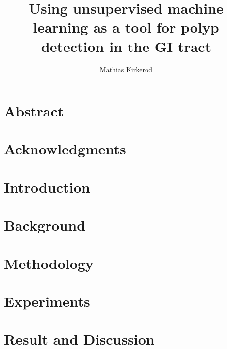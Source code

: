 \documentclass[a4paper,english,twoside,11pt]{ifimaster}
\title{Using unsupervised machine learning as a tool for polyp detection in the GI tract}
\author{Mathias Kirkerod}
\begin{document}
\duoforside[dept={Department of Informatics},program={Informatics: Technical and Scientific Applications},long]

\frontmatter{}
\chapter*{Abstract}


\chapter*{Acknowledgments}


\tableofcontents{}
\listoffigures{}
\listoftables{}


\mainmatter{}

\chapter{Introduction} \label{cap:introduction}


\chapter{Background} \label{cap:background}



\chapter{Methodology}\label{cap:methodology}



%

\chapter{Experiments} \label{cap:experiments}



\chapter{Result and Discussion} \label{cap:results}

\end{document}
